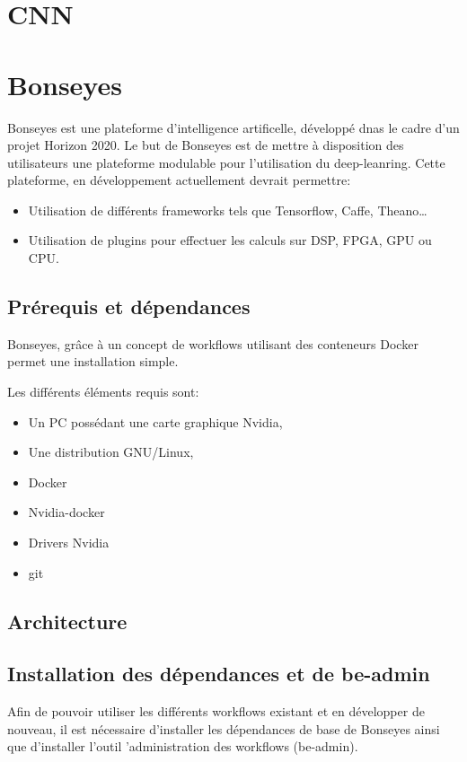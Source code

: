 \section{CNN}


\section{Bonseyes}
Bonseyes est une plateforme d'intelligence artificelle, développé dnas le cadre d'un projet Horizon 2020.
Le but de Bonseyes est de mettre à disposition des utilisateurs une plateforme modulable pour l'utilisation du deep-leanring.
Cette plateforme, en développement actuellement devrait permettre:
\begin{itemize}
	\item Utilisation de différents frameworks tels que Tensorflow, Caffe, Theano\dots
	\item Utilisation de plugins pour effectuer les calculs sur DSP, FPGA, GPU ou CPU.
\end{itemize}


\subsection{Prérequis et dépendances}
Bonseyes, grâce à un concept de workflows utilisant des conteneurs Docker permet une installation simple.

Les différents éléments requis sont:
\begin{itemize}
	\item Un PC possédant une carte graphique Nvidia,
	\item Une distribution GNU/Linux,
	\item Docker
	\item Nvidia-docker
	\item Drivers Nvidia
	\item git
\end{itemize}	

\subsection{Architecture}


\subsection{Installation des dépendances et de be-admin}
Afin de pouvoir utiliser les différents workflows existant et en développer de nouveau, il est nécessaire d'installer les dépendances de base de Bonseyes ainsi que d'installer l'outil 'administration des workflows (be-admin).

